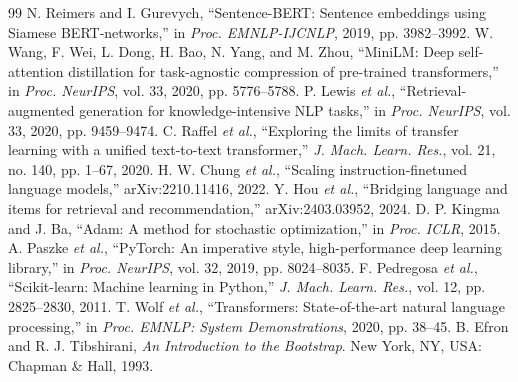 \documentclass[conference]{IEEEtran}
\begin{document}
\begin{thebibliography}{99}
 N. Reimers and I. Gurevych, ``Sentence-BERT: Sentence embeddings using Siamese BERT-networks,'' in \emph{Proc. EMNLP-IJCNLP}, 2019, pp. 3982--3992.
 W. Wang, F. Wei, L. Dong, H. Bao, N. Yang, and M. Zhou, ``MiniLM: Deep self-attention distillation for task-agnostic compression of pre-trained transformers,'' in \emph{Proc. NeurIPS}, vol. 33, 2020, pp. 5776--5788.
 P. Lewis \emph{et al.}, ``Retrieval-augmented generation for knowledge-intensive NLP tasks,'' in \emph{Proc. NeurIPS}, vol. 33, 2020, pp. 9459--9474.
 C. Raffel \emph{et al.}, ``Exploring the limits of transfer learning with a unified text-to-text transformer,'' \emph{J. Mach. Learn. Res.}, vol. 21, no. 140, pp. 1--67, 2020.
 H. W. Chung \emph{et al.}, ``Scaling instruction-finetuned language models,'' arXiv:2210.11416, 2022.
 Y. Hou \emph{et al.}, ``Bridging language and items for retrieval and recommendation,'' arXiv:2403.03952, 2024.
 D. P. Kingma and J. Ba, ``Adam: A method for stochastic optimization,'' in \emph{Proc. ICLR}, 2015.
 A. Paszke \emph{et al.}, ``PyTorch: An imperative style, high-performance deep learning library,'' in \emph{Proc. NeurIPS}, vol. 32, 2019, pp. 8024--8035.
 F. Pedregosa \emph{et al.}, ``Scikit-learn: Machine learning in Python,'' \emph{J. Mach. Learn. Res.}, vol. 12, pp. 2825--2830, 2011.
 T. Wolf \emph{et al.}, ``Transformers: State-of-the-art natural language processing,'' in \emph{Proc. EMNLP: System Demonstrations}, 2020, pp. 38--45.
 B. Efron and R. J. Tibshirani, \emph{An Introduction to the Bootstrap}. New York, NY, USA: Chapman \& Hall, 1993.
\end{thebibliography}
\end{document}
